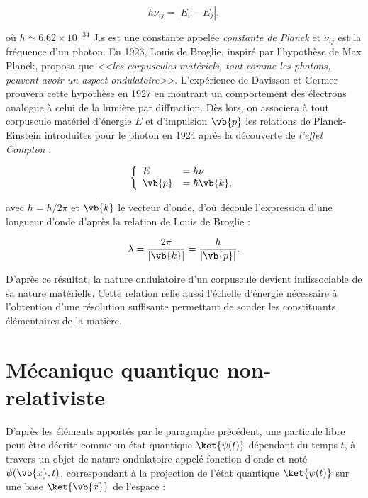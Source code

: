             \begin{equation}
                h\nu_{ij}=|E_i-E_j|,
            \end{equation}
            
        où $h\simeq6.62\times10^{-34}$ J.s est une constante appelée \textit{constante de Planck} et $\nu_{ij}$ est la fréquence d'un photon. En 1923, Louis de Broglie, inspiré par l'hypothèse de Max Planck, proposa  que \textit{<<les corpuscules matériels, tout comme les photons, peuvent avoir un aspect ondulatoire>>}. L'expérience de Davisson et Germer \cite{Germer1927} prouvera cette hypothèse en 1927 en montrant un comportement des électrons analogue à celui de la lumière par diffraction. Dès lors, on associera à tout corpuscule matériel d'énergie $E$ et d'impulsion $\vb{p}$ les relations de Planck-Einstein introduites pour le photon en 1924 après la découverte de \textit{l'effet Compton} \cite{Compton1923} :
            
            \begin{equation}
                \left\{
                    \begin{array}{ll}
                        E & = h\nu \\
                        \vb{p} & = \hbar\vb{k},
                    \end{array}
                \right.
            \end{equation}

            avec $\hbar=h/2\pi$ et $\vb{k}$ le vecteur d'onde, d'où découle l'expression d'une longueur d'onde d'après la relation de Louis de Broglie :
            
            \begin{equation}
                \lambda=\frac{2\pi}{|\vb{k}|}=\frac{h}{|\vb{p}|}.
            \end{equation}
            
        D'après ce résultat, la nature ondulatoire d'un corpuscule devient indissociable de sa nature matérielle. Cette relation relie aussi l'échelle d'énergie nécessaire à l'obtention d'une résolution suffisante permettant de sonder les constituants élémentaires de la matière.
        
        \section{Mécanique quantique non-relativiste}
        
         D'après les éléments apportés par le paragraphe précédent, une particule libre peut être décrite comme un état quantique $\ket{\psi(t)}$ dépendant du temps $t$, à travers un objet de nature ondulatoire appelé fonction d'onde et noté $\psi(\vb{x},t)$, correspondant à la projection de l'état quantique $\ket{\psi(t)}$ sur une base $\ket{\vb{x}}$ de l'espace :
        
